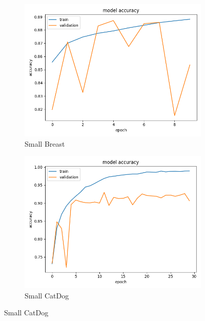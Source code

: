 \begin{figure}
\centering
\begin{subfigure}[b]{.45\linewidth}
\includegraphics[width=\linewidth]{Figs/small_breast_acc.jpg}
\caption{Small Breast}
\end{subfigure}
\begin{subfigure}[b]{.45\linewidth}
\includegraphics[width=\linewidth]{Figs/small_catdog_acc.jpg}
\caption{Small CatDog}
\end{subfigure}


\end{figure}
